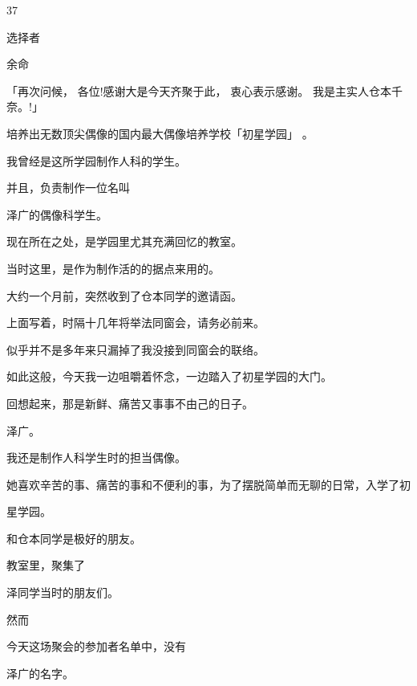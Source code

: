 37\par
选择者\par
余命\par
「再次问候， 各位!感谢大是今天齐聚于此， 衷心表示感谢。 我是主实人仓本千奈。!」\par
培养出无数顶尖偶像的国内最大偶像培养学校「初星学园」 。\par
我曾经是这所学园制作人科的学生。\par
并且，负责制作一位名叫\par
泽广的偶像科学生。\par
现在所在之处，是学园里尤其充满回忆的教室。\par
当时这里，是作为制作活的的据点来用的。\par
大约一个月前，突然收到了仓本同学的邀请函。\par
上面写着，时隔十几年将举法同窗会，请务必前来。\par
似乎并不是多年来只漏掉了我没接到同窗会的联络。\par
如此这般，今天我一边咀嚼着怀念，一边踏入了初星学园的大门。\par
回想起来，那是新鲜、痛苦又事事不由己的日子。\par
泽广。\par
我还是制作人科学生时的担当偶像。\par
她喜欢辛苦的事、痛苦的事和不便利的事，为了摆脱简单而无聊的日常，入学了初\par
星学园。\par
和仓本同学是极好的朋友。\par
教室里，聚集了\par
泽同学当时的朋友们。\par
然而\par
今天这场聚会的参加者名单中，没有\par
泽广的名字。\par

